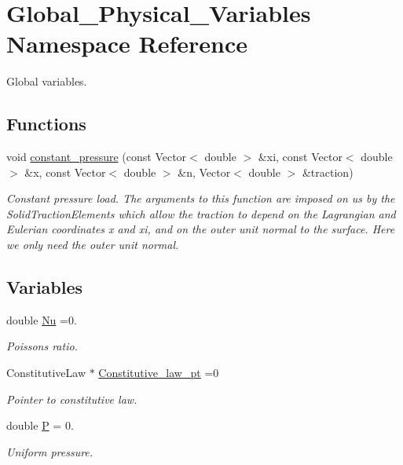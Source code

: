 \hypertarget{namespaceGlobal__Physical__Variables}{}\section{Global\+\_\+\+Physical\+\_\+\+Variables Namespace Reference}
\label{namespaceGlobal__Physical__Variables}


Global variables.  


\subsection*{Functions}
\begin{DoxyCompactItemize}
\item 
void \hyperlink{namespaceGlobal__Physical__Variables_a19f4e20a92e7d216b4d2b00308f96917}{constant\+\_\+pressure} (const Vector$<$ double $>$ \&xi, const Vector$<$ double $>$ \&x, const Vector$<$ double $>$ \&n, Vector$<$ double $>$ \&traction)
\begin{DoxyCompactList}\small\item\em Constant pressure load. The arguments to this function are imposed on us by the Solid\+Traction\+Elements which allow the traction to depend on the Lagrangian and Eulerian coordinates x and xi, and on the outer unit normal to the surface. Here we only need the outer unit normal. \end{DoxyCompactList}\end{DoxyCompactItemize}
\subsection*{Variables}
\begin{DoxyCompactItemize}
\item 
double \hyperlink{namespaceGlobal__Physical__Variables_a3962c36313826b19f216f6bbbdd6a477}{Nu} =0.
\begin{DoxyCompactList}\small\item\em Poisson\textquotesingle{}s ratio. \end{DoxyCompactList}\item 
Constitutive\+Law $\ast$ \hyperlink{namespaceGlobal__Physical__Variables_a2a37fb040c832ee7a086bb13bb02a100}{Constitutive\+\_\+law\+\_\+pt} =0
\begin{DoxyCompactList}\small\item\em Pointer to constitutive law. \end{DoxyCompactList}\item 
double \hyperlink{namespaceGlobal__Physical__Variables_a23c2ade6398f54040b869f7f3a2bcc4b}{P} = 0.
\begin{DoxyCompactList}\small\item\em Uniform pressure. \end{DoxyCompactList}\end{DoxyCompactItemize}


